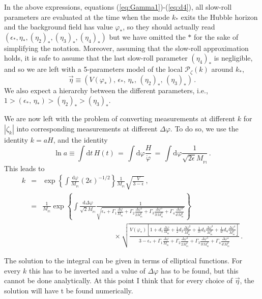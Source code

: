 \documentclass[prd, onecolumn, floatfix, letterpaper, nofootinbib, amsmath, amssymb, superscriptaddress]{revtex4}
\renewcommand{\(}{\left(}
\renewcommand{\)}{\right)}
\renewcommand{\[}{\left[}
\renewcommand{\]}{\right]}
\def\be{\begin{equation}}
\def\ee{\end{equation}}
\def\bea{\begin{eqnarray}}
\def\eea{\end{eqnarray}}
\newcommand{\Mp}{M_{_\mathrm{Pl}}}
\begin{document}
In the above expressions, equations (\ref{eq:Gamma1})-(\ref{eq:d4}), all slow-roll parameters are evaluated at the time when the mode $k_*$ exits the Hubble horizon and the background field has value $\varphi_*$, so they should actually read $(\epsilon_*, \eta_*, (\eta_2)_*, (\eta_3)_*, (\eta_4)_*)$ but we have omitted the $*$ for the sake of simplifying the notation. Moreover, assuming that the slow-roll approximation holds, it is safe to assume that the last slow-roll parameter $ (\eta_4)_*$ is negligible, and so we are left with a 5-parameters model of the local $\mathcal{P}_\zeta(k)$ around $k_*$,
\be
	\vec{\eta}\equiv\left(V(\varphi_*),\, \epsilon_*, \,\eta_*, \, (\eta_2)_*, \,(\eta_3)_*\right)\,.
\ee
We also expect a hierarchy between the different parameters, i.e., $1> (\epsilon_*, \,\eta_*)> (\eta_2)_*>(\eta_3)_*$.

\bigskip

We are now left with the problem of converting measurements at different $k$ for $|\zeta_k|$ into corresponding measurements at different $\Delta\varphi$. To do so, we use the identity $k=aH$, and the identity
\be
	\ln a \equiv \int  \mathrm{d}t \, H(t) \, = \, \int  \mathrm{d}\varphi \frac{H}{\dot\varphi}\, =\, \int \mathrm{d}\varphi \frac{1}{\sqrt{2\epsilon}\Mp}\, .
\ee
This leads to
\bea
	k&=&\exp\left\{ \int \frac{\mathrm{d}\varphi}{\Mp}(2\epsilon)^{-1/2}  \right\}\frac{1}{\Mp}\sqrt{\frac{V}{3-\epsilon}}\, ,\\
		&=&  \frac{1}{\Mp}\exp\left\{ \int \frac{\mathrm{d}\Delta\varphi}{\sqrt{2}\Mp}\frac{1}{\sqrt{\epsilon_*+\Gamma_1\frac{\Delta\varphi}{\Mp}+\Gamma_2\frac{\Delta\varphi^2}{2\Mp^2} +\Gamma_3\frac{\Delta\varphi^3}{3!\Mp^3}+\Gamma_4\frac{\Delta\varphi^4}{4!\Mp^4} }}  \right\}
		\nonumber
		\\
		\label{eq:kDeltavarphimapping}
		&&\qquad\qquad\qquad \qquad \qquad\times \sqrt{\frac{V(\varphi_*)\left[1+d_1\frac{\Delta\varphi}{\Mp}+\frac{1}{2}d_2\frac{\Delta\varphi^2}{\Mp^2}+\frac{1}{3!}d_3\frac{\Delta\varphi^3}{\Mp^3} +\frac{1}{4!}d_4\frac{\Delta\varphi^4}{\Mp^4}\right]}{3-\epsilon_*+\Gamma_1\frac{\Delta\varphi}{\Mp}+\Gamma_2\frac{\Delta\varphi^2}{2\Mp^2} +\Gamma_3\frac{\Delta\varphi^3}{3!\Mp^3}+\Gamma_4\frac{\Delta\varphi^4}{4!\Mp^4} }}  \,  .
\eea
 
 The solution to the integral can be given in terms of elliptical functions. For every $k$ this has to be inverted and a value of $\Delta \varphi$ has to be found, but this cannot be done analytically. At this point I think that for every choice of $\vec{\eta}$, the solution will have t be found numerically.
 
\end{document}
